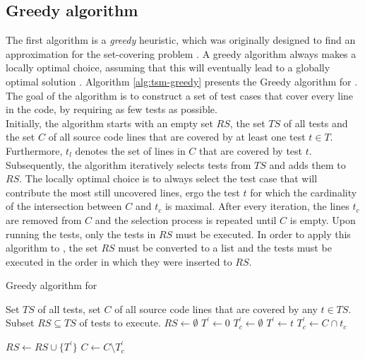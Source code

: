 
\subsection{Greedy algorithm}
The first algorithm is a \emph{greedy} heuristic, which was originally designed to find an approximation for the set-covering problem \cite{evaluationoftestsuiteminimization}. A greedy algorithm always makes a locally optimal choice, assuming that this will eventually lead to a globally optimal solution \cite{10.5555/1614191}. Algorithm \ref{alg:tsm-greedy} presents the Greedy algorithm for \tsm{}. The goal of the algorithm is to construct a set of test cases that cover every line in the code, by requiring as few tests as possible.\\

\noindent Initially, the algorithm starts with an empty set $RS$, the set $TS$ of all tests and the set $C$ of all source code lines that are covered by at least one test $t \in T$. Furthermore, $t_l$ denotes the set of lines in $C$ that are covered by test $t$. Subsequently, the algorithm iteratively selects tests from $TS$ and adds them to $RS$. The locally optimal choice is to always select the test case that will contribute the most still uncovered lines, ergo the test $t$ for which the cardinality of the intersection between $C$ and $t_c$ is maximal. After every iteration, the lines $t_c$ are removed from $C$ and the selection process is repeated until $C$ is empty. Upon running the tests, only the tests in $RS$ must be executed. In order to apply this algorithm to \tcp{}, the set $RS$ must be converted to a list and the tests must be executed in the order in which they were inserted to $RS$.

\begin{algorithm}[h!]
\caption{Greedy algorithm for \tsm{}}
\label{alg:tsm-greedy}
\begin{algorithmic}[1]
	 Set $TS$ of all tests, set $C$ of all source code lines that are covered by any $t \in TS$.
	 Subset $RS \subseteq TS$ of tests to execute.
	\State $RS \gets \emptyset$
		\State $T^{'} \gets 0$
		\State $T_{c}^{'} \gets \emptyset$
				\State $T^{'} \gets t$
				\State $T_{c}^{'} \gets C \cap t_{c}$
			\EndIf
		\EndFor
		
		\State $RS \gets RS \cup \{T^{'}\}$
		\State $C \gets C \setminus T_{c}^{'}$
	\EndWhile
\end{algorithmic}
\end{algorithm}
